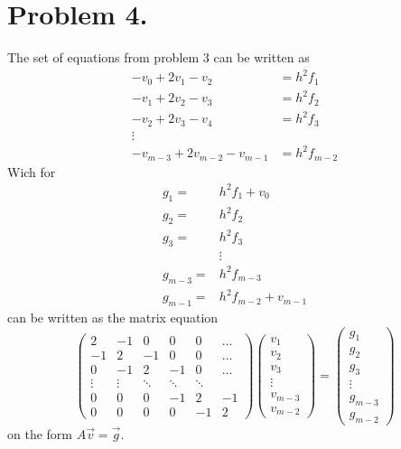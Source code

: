 \documentclass[english,notitlepage]{revtex4-1}  %
\begin{document}
\section*{Problem 4.}
    \label{sec:oppgave4}
    The set of equations from problem 3 can be written as 
    \begin{align*}
            -v_0 + 2v_1 - v_2 
        &=  h^2 f_1\\
            -v_1 + 2v_2 -v_3 
        &=  h^2 f_2\\
            -v_2 + 2v_3- v_4 
        &=  h^2 f_3\\
        \vdots&\\
            -v_{m-3} + 2 v_{m-2} - v_{m - 1}
        &=  h^2 f_{m-2}
    \end{align*}
    Wich for 
    \begin{align*}
            g_1
        =&  h^2 f_1 + v_0\\
            g_2
        =&  h^2 f_2\\
            g_3
        =&  h^2 f_3\\
        &\vdots\\
            g_{m - 3}
        =&  h^2 f_{m-3}\\
            g_{m-1}
        =&  h^2 f_{m-2} + v_{m - 1}
    \end{align*}
    can be written as the matrix equation
    \begin{equation*}
            \begin{pmatrix}
                2 & -1 & 0 &0 & 0 & \dots
                \\
                -1 & 2 & -1 & 0 & 0 & \dots
                \\
                0 & -1 & 2 & -1 & 0 & \dots
                \\
                \vdots & \vdots & \ddots & \ddots & \ddots
                \\
                0 & 0 & 0 & -1 & 2 & -1
                \\ 
                0 & 0 & 0 & 0 & -1 & 2 
            \end{pmatrix}
            \begin{pmatrix}
                v_1 \\ v_2 \\ v_3 \\ \vdots \\ v_{m - 3} \\ v_{m - 2} 
            \end{pmatrix} 
        =   \begin{pmatrix}
                g_1 \\ g_2 \\ g_3 \\ \vdots \\ g_{m - 3} \\ g_{m - 2}
            \end{pmatrix}
    \end{equation*}
    on the form $A\vec{v} = \vec{g}$.
\end{document}
